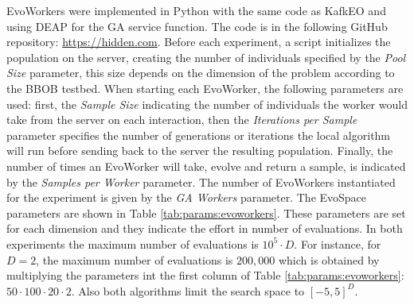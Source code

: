 \documentclass[sigconf]{acmart}
\begin{document}
EvoWorkers were implemented in Python with the same code as KafkEO and using 
DEAP \cite{fortin2012deap} for the GA service function. The code is in the
following GitHub repository: \url{https://hidden.com}. Before each
experiment, a script initializes the population on the server, creating the
number of individuals specified by the {\em Pool Size} parameter, this
size depends on the dimension of the problem according to the BBOB testbed. 
When starting each EvoWorker, the following parameters are used: first, the
{\em Sample Size} indicating the number of individuals the worker would take
from the server on each interaction, then the {\em Iterations per Sample} 
parameter specifies the number of generations or iterations the local algorithm
will run before sending back to the server the resulting population. Finally,
the number of times an  EvoWorker will take, evolve and return a sample, is 
indicated by the {\em Samples per Worker} parameter. The number of EvoWorkers instantiated for the experiment is given by the {\em GA Workers} parameter.  The EvoSpace parameters 
are shown in Table \ref{tab:params:evoworkers}.
 These parameters are set for  
each dimension and they indicate the effort in number of evaluations. In both
 experiments the maximum number of evaluations is $10^5 \cdot D$. For instance, 
 for $D = 2$, the maximum number of evaluations is $200,000$ which is obtained by multiplying
  the parameters int the first column of Table \ref{tab:params:evoworkers}: $50 \cdot 100 \cdot 20 \cdot 2$. Also both algorithms limit the search space to $[-5,5]^D$. 
\end{document}
